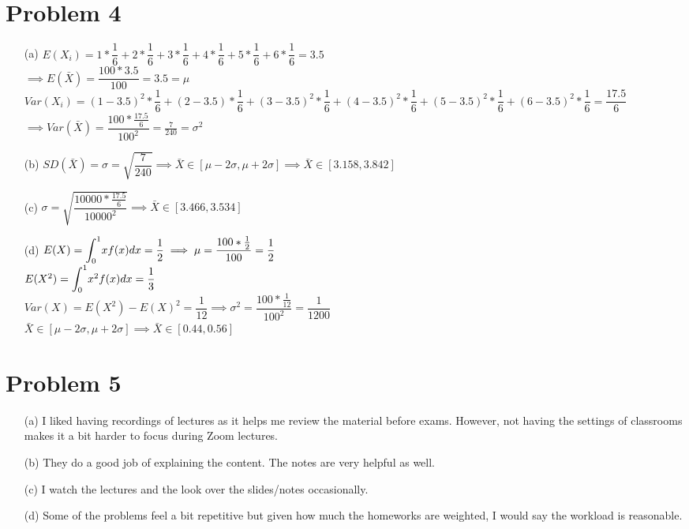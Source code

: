 \documentclass{article}
\begin{document}
\section*{Problem 4}
\begin{itemize}
	\item [(a)] $E(X_i)=1*\dfrac{1}{6}+2*\dfrac{1}{6}+3*\dfrac{1}{6}+4*\dfrac{1}{6}+5*\dfrac{1}{6}+6*\dfrac{1}{6}=3.5$\\$\implies E(\bar{X})=\dfrac{100*3.5}{100}=\boxed{3.5}=\mu$\\$Var(X_i)=(1-3.5)^2*\dfrac{1}{6}+(2-3.5)*\dfrac{1}{6}+(3-3.5)^2*\dfrac{1}{6}+(4-3.5)^2*\dfrac{1}{6}+(5-3.5)^2*\dfrac{1}{6}+(6-3.5)^2*\dfrac{1}{6}=\dfrac{17.5}{6}$\\$\implies Var(\bar{X})=\dfrac{100*\frac{17.5}{6}}{100^2}=\boxed{\frac{7}{240}}=\sigma^2$
	\item [(b)] $SD(\bar{X})=\sigma=\sqrt{\dfrac{7}{240}}\implies\bar{X}\in[\mu-2\sigma,\mu+2\sigma]\implies\boxed{\bar{X}\in[3.158,3.842]}$
	\item [(c)] $\sigma=\sqrt{\dfrac{10000*\frac{17.5}{6}}{10000^2}}\implies\boxed{\bar{X}\in[3.466,3.534]}$
	\item [(d)] $E(X)=\mathlarger{\int_0^1}xf(x)dx=\dfrac{1}{2}\implies\mu=\dfrac{100*\frac{1}{2}}{100}=\dfrac{1}{2}$\\$E(X^2)=\mathlarger{\int_0^1}x^2f(x)dx=\dfrac{1}{3}$\\$Var(X)=E(X^2)-E(X)^2=\dfrac{1}{12}\implies\sigma^2=\dfrac{100*\frac{1}{12}}{100^2}=\dfrac{1}{1200}$\\$\bar{X}\in[\mu-2\sigma,\mu+2\sigma]\implies\boxed{\bar{X}\in[0.44,0.56]}$
\end{itemize}

\section*{Problem 5}
\begin{itemize}
	\item [(a)] I liked having recordings of lectures as it helps me review the material before exams. However, not having the settings of classrooms makes it a bit harder to focus during Zoom lectures.
	\item [(b)] They do a good job of explaining the content. The notes are very helpful as well.
	\item [(c)] I watch the lectures and the look over the slides/notes occasionally.
	\item [(d)] Some of the problems feel a bit repetitive but given how much the homeworks are weighted, I would say the workload is reasonable.
\end{itemize}
\end{document}
